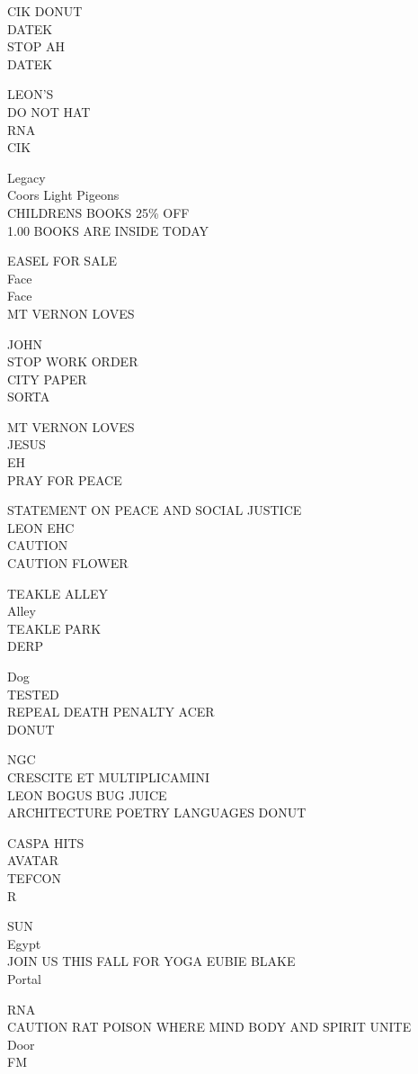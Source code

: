 \documentclass[10pt,letterpaper]{article}
\begin{document}
CIK DONUT\\
DATEK\\
STOP AH\\
DATEK

LEON'S\\
DO NOT HAT\\
RNA\\
CIK

Legacy\\
Coors Light Pigeons\\
CHILDRENS BOOKS 25\% OFF\\
1.00 BOOKS ARE INSIDE TODAY

EASEL FOR SALE\\
Face\\
Face\\
MT VERNON LOVES

JOHN\\
STOP WORK ORDER\\
CITY PAPER\\
SORTA

MT VERNON LOVES\\
JESUS\\
EH\\
PRAY FOR PEACE

STATEMENT ON PEACE AND SOCIAL JUSTICE\\
LEON EHC\\
CAUTION\\
CAUTION FLOWER

TEAKLE ALLEY\\
Alley\\
TEAKLE PARK\\
DERP

Dog\\
TESTED\\
REPEAL DEATH PENALTY ACER\\
DONUT

NGC\\
CRESCITE ET MULTIPLICAMINI\\
LEON BOGUS BUG JUICE\\
ARCHITECTURE POETRY LANGUAGES DONUT

CASPA HITS\\
AVATAR\\
TEFCON\\
R

SUN\\
Egypt\\
JOIN US THIS FALL FOR YOGA EUBIE BLAKE\\
Portal

RNA\\
CAUTION RAT POISON WHERE MIND BODY AND SPIRIT UNITE\\
Door\\
FM
\end{document}

